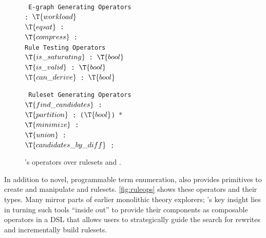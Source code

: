 \renewcommand{\to}{\textrightarrow\xspace}
\newcommand{\head}[1]{\textsf{\sc #1}}
\begin{figure}
  \footnotesize
  \begin{minipage}[t]{0.5\linewidth}
  \centering
    \raggedright\tt
    \head{E-graph Generating Operators} \\
    \vspace{4pt}
    \toeggl  : $\T{workload}$ \to \eggl \\
    $\T{eqsat}$    : \eggl \to {} \to \eggl \\
    $\T{compress}$ : \eggl \to {} \to \eggl \\[1mm]
    \vspace{4pt}
    \head{Rule Testing Operators} \\
    \vspace{4pt}
    $\T{is\_saturating}$ : \rl \to $\T{bool}$ \\
    $\T{is\_valid}$      : \rl \to $\T{bool}$ \\
    $\T{can\_derive}$    :  \to \rl \to $\T{bool}$
    \vspace{4pt}
  \end{minipage}
  \begin{minipage}[t]{0.65\linewidth}
  \centering
    \raggedright\tt
    \head{Ruleset Generating Operators} \\
    \vspace{4pt}
    $\T{find\_candidates}$    : \eggl \to {} \\
    $\T{partition}$          :  \to (\rl \to $\T{bool}$) \to {} $\ast$  \\
    $\T{minimize}$           :  \to {} \to {} \\
    $\T{union}$              :  \to {} \to {} \\
    $\T{candidates\_by\_diff}$ : \eggl \to \eggl \to {}
  \end{minipage}
  \caption{
    \enumo's operators over rulesets and \egraphs.
  }\label{fig:ruleops}
\end{figure}

In addition to novel, programmable term enumeration,
 \enumo also provides primitives to
 create and manipulate \egraphs and rulesets.
\autoref{fig:ruleops} shows
  these operators and their types.
Many mirror parts of
  earlier monolithic theory explorers;
\enumo's key insight lies in turning such tools
  ``inside out'' to provide their components
  as composable operators in a DSL that
  allows users to strategically guide
  the search for rewrites and
  incrementally build rulesets.

